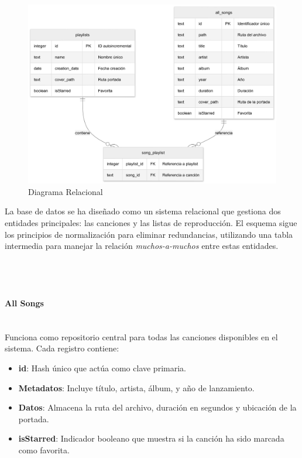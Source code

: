 \documentclass[11pt, a4paper]{article}
\begin{document}
            \begin{figure}[H]
              \centering
              \includegraphics[width=1\textwidth]{media/DiagramaRelacional.png}
              \caption{Diagrama Relacional}
              \label{fig:relacional}
            \end{figure}

            La base de datos se ha diseñado como un sistema relacional que gestiona dos entidades principales: las canciones y las listas de reproducción. El esquema sigue los principios de normalización para eliminar redundancias, utilizando una tabla intermedia para manejar la relación \textit{muchos-a-muchos} entre estas entidades. \\ \\ \\ \\

              \paragraph{All Songs}
              ‎ \\

              Funciona como repositorio central para todas las canciones disponibles en el sistema. Cada registro contiene:

              \begin{itemize}
                \item \textbf{id}: Hash único que actúa como clave primaria.
                \item \textbf{Metadatos}: Incluye título, artista, álbum, y año de lanzamiento.
                \item \textbf{Datos}:  Almacena la ruta del archivo, duración en segundos y ubicación de la portada.
                \item \textbf{isStarred}: Indicador booleano que muestra si la canción ha sido marcada como favorita.
              \end{itemize}
\end{document}
